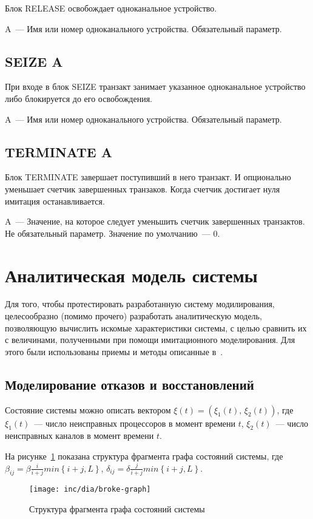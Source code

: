 Блок RELEASE освобождает одноканальное устройство.

A~--- Имя или номер одноканального устройства. Обязательный параметр.

\subsection*{SEIZE A}

При входе в блок SEIZE транзакт занимает указанное одноканальное устройство либо блокируется до его освобождения.

A~--- Имя или номер одноканального устройства. Обязательный параметр.

\subsection*{TERMINATE A}

Блок TERMINATE завершает поступивший в него транзакт. И опционально уменьшает счетчик завершенных транзаков. Когда счетчик достигает нуля имитация останавливается.

A~--- Значение, на которое следует уменьшить счетчик завершенных транзактов. Не обязательный параметр. Значение по умолчанию~--- 0.

\section{Аналитическая модель системы}

Для того, чтобы протестировать разработанную систему модилирования, целесообразно (помимо прочего) разработать аналитическую модель, позволяющую вычислить искомые характеристики системы, с целью сравнить их с величинами, полученными при помощи имитационного моделирования. Для этого были использованы приемы и методы описанные в~\cite{Kurov}.

\subsection{Моделирование отказов и восстановлений}
Состояние системы можно описать вектором $ \xi (t) = (\xi_{1}(t),\,\xi_{2}(t))$, где $\xi_{1}(t)$~--- число неисправных процессоров в момент времени $t$, $\xi_{2}(t)$~--- число неисправных каналов в момент времени $t$.

На рисунке~\ref{fig:broke-graph} показана структура фрагмента графа состояний системы, где $\beta_{ij}=\beta\frac{i}{i+j}min\left\lbrace i+j,L\right\rbrace$, $\delta_{ij}=\delta\frac{j}{i+j}min\left\lbrace i+j,L\right\rbrace$. 
\begin{figure}[ht]
\centering
\texttt{[image: inc/dia/broke-graph]}
\caption{Структура фрагмента графа состояний системы}
\label{fig:broke-graph}
\end{figure}


